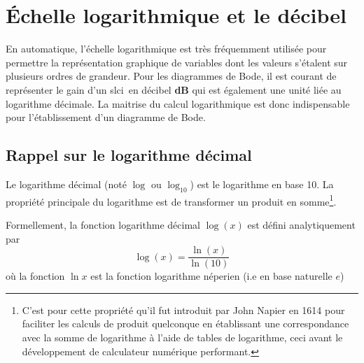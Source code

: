 \chapter{\'Echelle logarithmique et le décibel~\label{annexe-log}}

En automatique, l'échelle logarithmique est très fréquemment 
utilisée pour permettre la représentation
graphique de variables dont les valeurs s'étalent sur plusieurs ordres 
de grandeur. Pour les diagrammes de Bode, il est courant de représenter le gain 
d'un \gls{slci}~en décibel \textbf{dB} qui est également une unité liée au 
logarithme décimale. La maitrise du calcul logarithmique est donc indispensable
pour l'établissement d'un diagramme de Bode.

\section{Rappel sur le logarithme décimal}
Le logarithme décimal (noté $\log$ ou $\log_{10}$) est le logarithme en base 10.
La propriété principale du logarithme est de transformer un produit en 
somme\footnote{C'est pour cette propriété qu'il fut introduit par John Napier 
en 1614 pour faciliter les calculs de produit quelconque en établissant une 
correspondance avec la somme de logarithme à l'aide de tables de logarithme, 
ceci avant le développement de calculateur numérique performant.}.

Formellement, la fonction logarithme décimal $\log{(x)}$ est défini 
analytiquement par 
$$
\log{(x)}=\dfrac{\ln{(x)}}{\ln{(10)}}
$$
où la fonction $\ln{x}$ est la fonction logarithme néperien (i.e en base 
naturelle $e$) 

